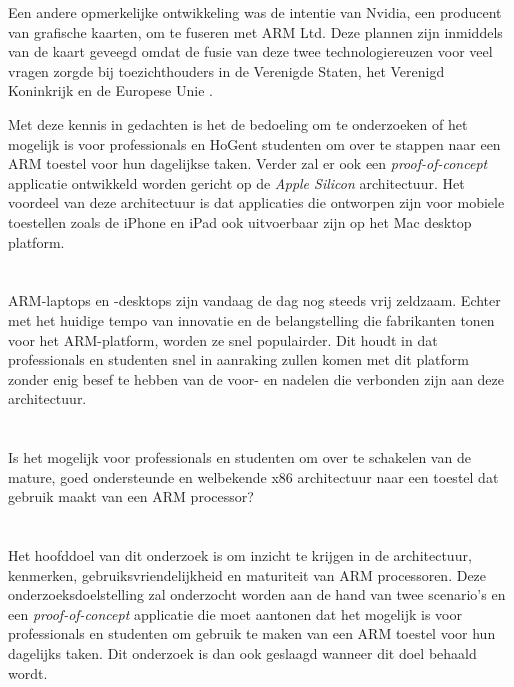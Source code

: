 Een andere opmerkelijke ontwikkeling was de intentie van Nvidia, een producent van grafische kaarten, om te fuseren met ARM Ltd. Deze plannen zijn inmiddels van de kaart geveegd omdat de fusie van deze twee technologiereuzen voor veel vragen zorgde bij toezichthouders in de Verenigde Staten, het Verenigd Koninkrijk en de Europese Unie \autocite{Dowd2022}. 

Met deze kennis in gedachten is het de bedoeling om te onderzoeken of het mogelijk is voor professionals en HoGent studenten om over te stappen naar een ARM toestel voor hun dagelijkse taken. Verder zal er ook een \textit{proof-of-concept} applicatie ontwikkeld worden gericht op de \textit{Apple Silicon} architectuur. Het voordeel van deze architectuur is dat applicaties die ontworpen zijn voor mobiele toestellen zoals de iPhone en iPad ook uitvoerbaar zijn op het Mac desktop platform.

\section{}
\label{sec:probleemstelling}

ARM-laptops en -desktops zijn vandaag de dag nog steeds vrij zeldzaam. Echter met het huidige tempo van innovatie en de belangstelling die fabrikanten tonen voor het ARM-platform, worden ze snel populairder. Dit houdt in dat professionals en studenten snel in aanraking zullen komen met dit platform zonder enig besef te hebben van de voor- en nadelen die verbonden zijn aan deze architectuur. 

\section{}
\label{sec:onderzoeksvraag}

Is het mogelijk voor professionals en studenten om over te schakelen van de mature, goed ondersteunde en welbekende x86 architectuur naar een toestel dat gebruik maakt van een ARM processor? 

\section{}
\label{sec:onderzoeksdoelstelling}

Het hoofddoel van dit onderzoek is om inzicht te krijgen in de architectuur, kenmerken, gebruiksvriendelijkheid en maturiteit van ARM processoren. Deze onderzoeksdoelstelling zal onderzocht worden aan de hand van twee scenario’s en een \textit{proof-of-concept} applicatie die moet aantonen dat het mogelijk is voor professionals en studenten om gebruik te maken van een ARM toestel voor hun dagelijks taken. Dit onderzoek is dan ook geslaagd wanneer dit doel behaald wordt.

